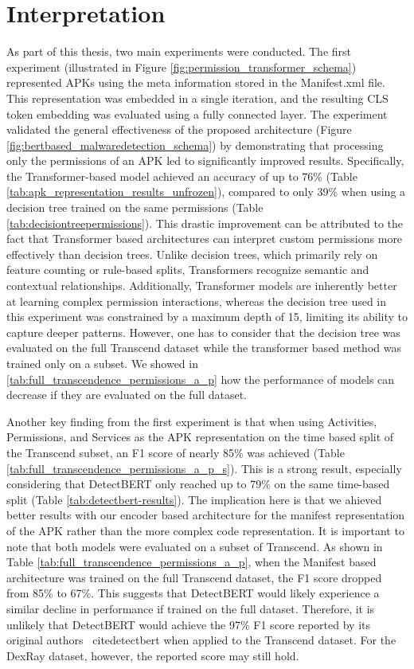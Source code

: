 \section{Interpretation}
\label{sec:interpretation}

As part of this thesis, two main experiments were conducted.
The first experiment (illustrated in Figure \ref{fig:permission_transformer_schema}) 
represented APKs using the meta information stored in the Manifest.xml file.
This representation was embedded in a single iteration, 
and the resulting CLS token embedding was evaluated using a fully connected layer.
The experiment validated the general effectiveness of the proposed architecture 
(Figure \ref{fig:bertbased_malwaredetection_schema}) by demonstrating that processing 
only the permissions of an APK led to significantly improved results.
Specifically, the Transformer-based model achieved an accuracy of up to 76\% 
(Table \ref{tab:apk_representation_results_unfrozen}), 
compared to only 39\% when using a decision tree trained on the same permissions (Table \ref{tab:decisiontreepermissions}).
This drastic improvement can be attributed to the fact that Transformer based architectures 
can interpret custom permissions more effectively than decision trees.
Unlike decision trees, which primarily rely on feature counting or rule-based splits, 
Transformers recognize semantic and contextual relationships.
Additionally, Transformer models are inherently better at learning complex permission interactions, 
whereas the decision tree used in this experiment was constrained by a maximum depth of 15, 
limiting its ability to capture deeper patterns.
However, one has to consider that the decision tree was evaluated on the full Transcend dataset while the 
transformer based method was trained only on a subset. We showed in \ref{tab:full_transcendence_permissions_a_p} 
how the performance of models can decrease if they are evaluated on the full dataset.

Another key finding from the first experiment is that when using Activities, Permissions, 
and Services as the APK representation on the time based split of the Transcend subset, 
an F1 score of nearly 85\% was achieved (Table \ref{tab:full_transcendence_permissions_a_p_s}).  
This is a strong result, especially considering that DetectBERT only reached up to 79\% 
on the same time-based split (Table \ref{tab:detectbert-results}).  
The implication here is that we ahieved better results with our encoder based architecture for the 
manifest representation of the APK rather than the more complex code representation.
It is important to note that both models were evaluated on a subset of Transcend. 
As shown in Table \ref{tab:full_transcendence_permissions_a_p}, 
when the Manifest based architecture was trained on the full Transcend dataset, the F1 score dropped from 85\% to 67\%.  
This suggests that DetectBERT would likely experience a similar decline in performance if trained on the full dataset.  
Therefore, it is unlikely that DetectBERT would achieve the 97\% F1 score reported by its original authors \
cite{detectbert} when applied to the Transcend dataset.
For the DexRay dataset, however, the reported score may still hold.


